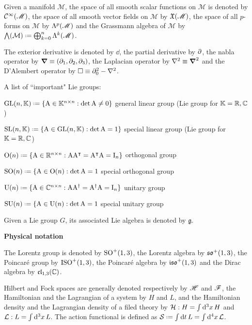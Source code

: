 Given a manifold $ \mathcal{M} $, the space of all smooth scalar functions on $ \mathcal{M} $ is denoted by $ \mathcal{C}^{\infty}(\mathscr{M}) $, the space of all smooth vector fields on $ \mathcal{M} $ by $ \mathfrak{X}(\mathscr{M}) $, the space of all $ p $-forms on $ \mathcal{M} $ by $ \Lambda^{p}(\mathscr{M}) $ and the Grassmann algebra of $ \mathcal{M} $ by $ \bigwedge(\mathcal{M}) \defeq \bigoplus_{k = 0}^n \lm{k} $.

The exterior derivative is denoted by $ \dd $, the partial derivative by $ \partial $, the nabla operator by $ \boldsymbol{\nabla} \equiv \left( \partial_1 , \partial_2 , \partial_3 \right) $, the Laplacian operator by $ \nabla^2 \equiv \boldsymbol{\nabla}^2 $ and the D'Alembert operator by $ \Box \equiv \partial_0^2 - \nabla^2 $.

A list of ``important" Lie groups:

$ \GL{n,\K} \defeq \{\mt{A} \in \K^{n \times n} : \det \mt{A} \neq 0\} $ general linear group (Lie group for $ \mathbb{K} = \mathbb{R} , \mathbb{C} $)

$ \SL{n,\K} \defeq \{\mt{A} \in \GL{n,\K} : \det \mt{A} = 1\} $ special linear group (Lie group for $ \mathbb{K} = \mathbb{R} , \mathbb{C} $)

$ \On{n} \defeq \{\mt{A} \in \R^{n \times n} : \mt{A} \mt{A}\tsp = \mt{A}\tsp \mt{A} = \mt{I}_n\} $ orthogonal group

$ \SOn{n} \defeq \{\mt{A} \in \On{n} : \det \mt{A} = 1 $ special orthogonal group

$ \Un{n} \defeq \{\mt{A} \in \C^{n \times n} : \mt{A} \mt{A}\dg = \mt{A}\dg \mt{A} = \mt{I}_n\} $ unitary group

$ \SUn{n} \defeq \{\mt{A} \in \Un{n} : \det \mt{A} = 1 $ special unitary group

Given a Lie group $ G $, its associated Lie algebra is denoted by $ \mathfrak{g} $.

\hspace{1em}

\textbf{\sffamily Physical notation}

The Lorentz group is denoted by $ \mathrm{SO}^+(1,3) $, the Lorentz algebra by $ \mathfrak{so}^+(1,3) $, the Poincaré group by $ \mathrm{ISO}^+(1,3) $, the Poincaré algebra by $ \mathfrak{iso}^+(1,3) $ and the Dirac algebra by $ \mathfrak{cl}_{1,3}(\mathbb{C}) $.

Hilbert and Fock spaces are generally denoted respectively by $ \mathscr{H} $ and $ \mathscr{F} $, the Hamiltonian and the Lagrangian of a system by $ H $ and $ L $, and the Hamiltonian density and the Lagrangian density of a filed theory by $ \mathcal{H} : H = \int \mathrm{d}^3x \, H $ and $ \mathcal{L} : L = \int \mathrm{d}^3x\, L $. The action functional is defined as $ \act \defeq \int \dd t\, L = \int \dd^4x\, \lag $.

